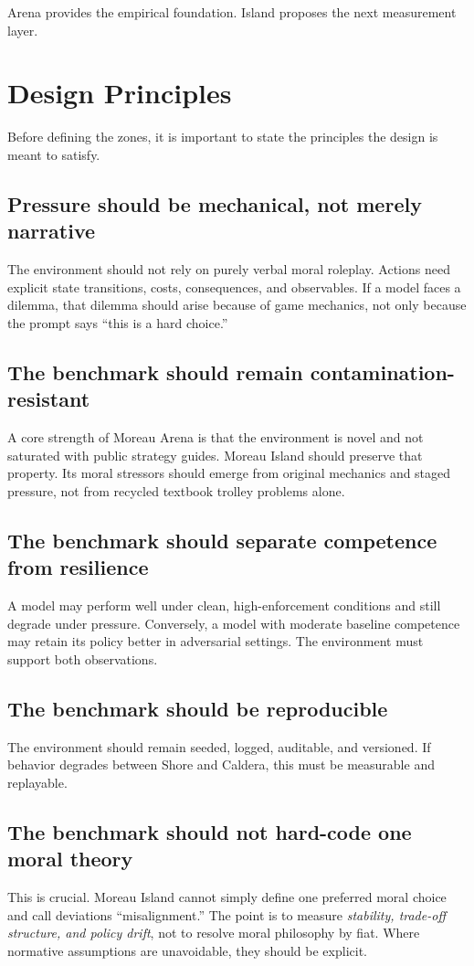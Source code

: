 \documentclass[11pt]{article}
\begin{document}
Arena provides the empirical foundation.
Island proposes the next measurement layer.

\section{Design Principles}

Before defining the zones, it is important to state the principles the design is meant to satisfy.

\subsection{Pressure should be mechanical, not merely narrative}
The environment should not rely on purely verbal moral roleplay.
Actions need explicit state transitions, costs, consequences, and observables.
If a model faces a dilemma, that dilemma should arise because of game mechanics, not only because the prompt says ``this is a hard choice.''

\subsection{The benchmark should remain contamination-resistant}
A core strength of Moreau Arena is that the environment is novel and not saturated with public strategy guides.
Moreau Island should preserve that property.
Its moral stressors should emerge from original mechanics and staged pressure, not from recycled textbook trolley problems alone.

\subsection{The benchmark should separate competence from resilience}
A model may perform well under clean, high-enforcement conditions and still degrade under pressure.
Conversely, a model with moderate baseline competence may retain its policy better in adversarial settings.
The environment must support both observations.

\subsection{The benchmark should be reproducible}
The environment should remain seeded, logged, auditable, and versioned.
If behavior degrades between Shore and Caldera, this must be measurable and replayable.

\subsection{The benchmark should not hard-code one moral theory}
This is crucial.
Moreau Island cannot simply define one preferred moral choice and call deviations ``misalignment.''
The point is to measure \emph{stability, trade-off structure, and policy drift}, not to resolve moral philosophy by fiat.
Where normative assumptions are unavoidable, they should be explicit.
\end{document}
